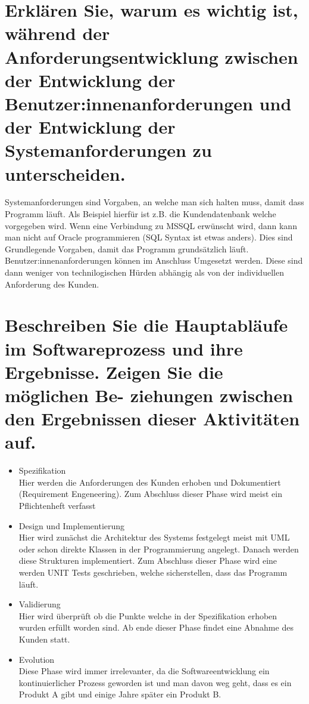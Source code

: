 \documentclass[12pt]{article}
\begin{document}
\section{Erklären Sie, warum es wichtig ist, während der Anforderungsentwicklung zwischen der Entwicklung der
Benutzer:innenanforderungen und der Entwicklung der Systemanforderungen zu unterscheiden.}
Systemanforderungen sind Vorgaben, an welche man sich halten muss, damit dass Programm läuft. Als Beispiel hierfür ist z.B. die Kundendatenbank welche vorgegeben wird. Wenn eine Verbindung zu MSSQL erwünscht wird, dann kann man nicht auf Oracle programmieren (SQL Syntax ist etwas anders). Dies sind Grundlegende Vorgaben, damit das Programm grundsätzlich läuft. Benutzer:innenanforderungen können im Anschluss Umgesetzt werden. Diese sind dann weniger von technilogischen Hürden abhängig als von der individuellen Anforderung des Kunden.

\section{Beschreiben Sie die Hauptabläufe im Softwareprozess und ihre Ergebnisse. Zeigen Sie die möglichen Be-
ziehungen zwischen den Ergebnissen dieser Aktivitäten auf.}
\begin{itemize}
 \item Spezifikation\\
 Hier werden die Anforderungen des Kunden erhoben und Dokumentiert (Requirement Engeneering). Zum Abschluss dieser Phase wird meist ein Pflichtenheft verfasst
 \item Design und Implementierung\\
 Hier wird zunächst die Architektur des Systems festgelegt meist mit UML oder schon direkte Klassen in der Programmierung angelegt. Danach werden diese Strukturen implementiert. Zum Abschluss dieser Phase wird eine werden UNIT Tests geschrieben, welche sicherstellen, dass das Programm läuft.
 \item Validierung\\
 Hier wird überprüft ob die Punkte welche in der Spezifikation erhoben wurden erfüllt worden sind. Ab ende dieser Phase findet eine Abnahme des Kunden statt.
 \item Evolution\\
 Diese Phase wird immer irrelevanter, da die Softwareentwicklung ein kontinuierlicher Prozess geworden ist und man davon weg geht, dass es ein Produkt A gibt und einige Jahre später ein Produkt B.
\end{itemize}
\pagebreak
\end{document}
